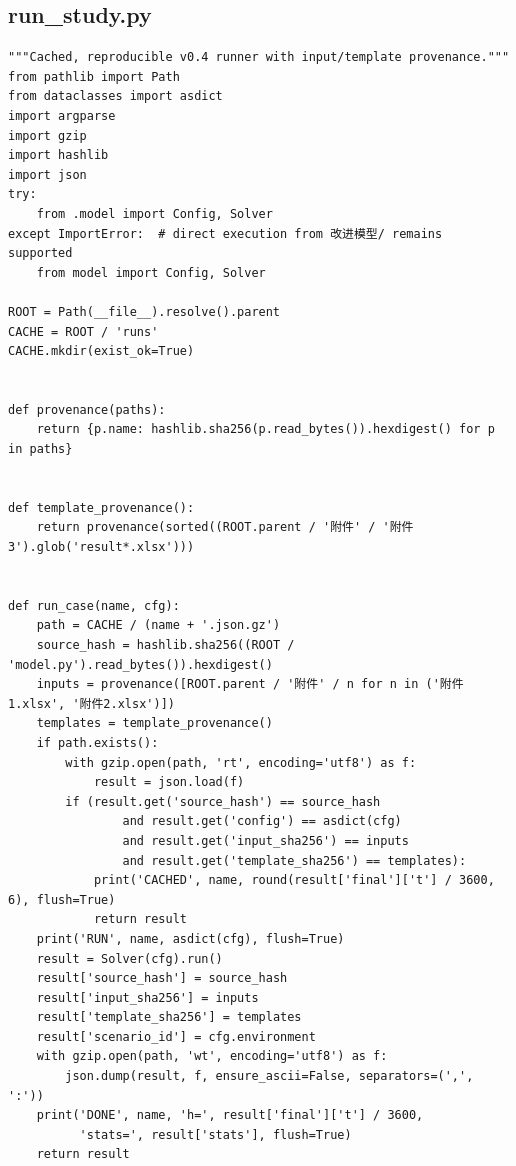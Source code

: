 \subsection{run\_study.py}
\begin{verbatim}
"""Cached, reproducible v0.4 runner with input/template provenance."""
from pathlib import Path
from dataclasses import asdict
import argparse
import gzip
import hashlib
import json
try:
    from .model import Config, Solver
except ImportError:  # direct execution from 改进模型/ remains supported
    from model import Config, Solver

ROOT = Path(__file__).resolve().parent
CACHE = ROOT / 'runs'
CACHE.mkdir(exist_ok=True)


def provenance(paths):
    return {p.name: hashlib.sha256(p.read_bytes()).hexdigest() for p in paths}


def template_provenance():
    return provenance(sorted((ROOT.parent / '附件' / '附件3').glob('result*.xlsx')))


def run_case(name, cfg):
    path = CACHE / (name + '.json.gz')
    source_hash = hashlib.sha256((ROOT / 'model.py').read_bytes()).hexdigest()
    inputs = provenance([ROOT.parent / '附件' / n for n in ('附件1.xlsx', '附件2.xlsx')])
    templates = template_provenance()
    if path.exists():
        with gzip.open(path, 'rt', encoding='utf8') as f:
            result = json.load(f)
        if (result.get('source_hash') == source_hash
                and result.get('config') == asdict(cfg)
                and result.get('input_sha256') == inputs
                and result.get('template_sha256') == templates):
            print('CACHED', name, round(result['final']['t'] / 3600, 6), flush=True)
            return result
    print('RUN', name, asdict(cfg), flush=True)
    result = Solver(cfg).run()
    result['source_hash'] = source_hash
    result['input_sha256'] = inputs
    result['template_sha256'] = templates
    result['scenario_id'] = cfg.environment
    with gzip.open(path, 'wt', encoding='utf8') as f:
        json.dump(result, f, ensure_ascii=False, separators=(',', ':'))
    print('DONE', name, 'h=', result['final']['t'] / 3600,
          'stats=', result['stats'], flush=True)
    return result



\end{verbatim}

